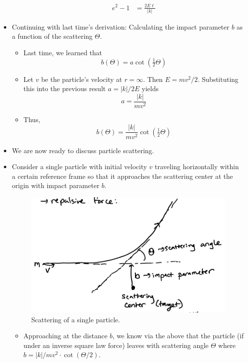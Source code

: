\documentclass[../notes.tex]{subfiles}
\begin{document}
\begin{itemize}
\begin{itemize}
\begin{align*}
            e^2-1 &= \frac{2E\ell}{|k|}
        \end{align*}
    \end{itemize}
    \item Continuing with last time's derivation: Calculating the impact parameter $b$ as a function of the scattering $\Theta$.
    \begin{itemize}
        \item Last time, we learned that
        \begin{equation*}
            b(\Theta) = a\cot\left( \tfrac{1}{2}\Theta \right)
        \end{equation*}
        \item Let $v$ be the particle's velocity at $r=\infty$. Then $E=mv^2/2$. Substituting this into the previous result $a=|k|/2E$ yields
        \begin{equation*}
            a = \frac{|k|}{mv^2}
        \end{equation*}
        \item Thus,
        \begin{equation*}
            b(\Theta) = \frac{|k|}{mv^2}\cot\left( \tfrac{1}{2}\Theta \right)
        \end{equation*}
    \end{itemize}
    \item We are now ready to discuss particle scattering.
    \item Consider a single particle with initial velocity $v$ traveling horizontally within a certain reference frame so that it approaches the scattering center at the origin with impact parameter $b$.
    \begin{figure}[h!]
        \centering
        \includegraphics[width=0.4\linewidth]{../ExtFiles/scatteringSP.png}
        \caption{Scattering of a single particle.}
        \label{fig:scatteringSP}
    \end{figure}
    \begin{itemize}
        \item Approaching at the distance $b$, we know via the above that the particle (if under an inverse square law force) leaves with scattering angle $\Theta$ where $b=|k|/mv^2\cdot\cot(\Theta/2)$.

\end{itemize}
\end{itemize}
\end{document}
